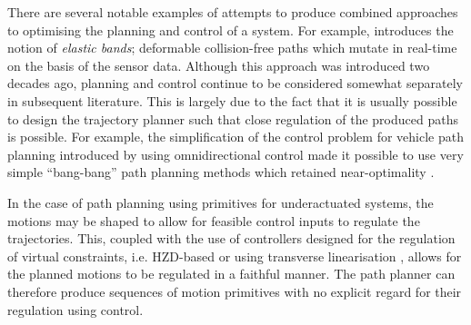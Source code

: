 There are several notable examples of attempts to produce combined approaches to optimising the planning and control of a system. For example, \cite{quinlan1993elastic} introduces the notion of \textit{elastic bands}; deformable collision-free paths which mutate in real-time on the basis of the sensor data. Although this approach was introduced two decades ago, planning and control continue to be considered somewhat separately in subsequent literature. This is largely due to the fact that it is usually possible to design the trajectory planner such that close regulation of the produced paths is possible. For example, the simplification of the control problem for vehicle path planning introduced by using omnidirectional control made it possible to use very simple ``bang-bang'' path planning methods which retained near-optimality \cite{kalmar2004near}.

In the case of path planning using primitives for underactuated systems, the motions may be shaped to allow for feasible control inputs to regulate the trajectories. This, coupled with the use of controllers designed for the regulation of virtual constraints, i.e. HZD-based \cite{sreenath2011compliant} or using transverse linearisation \cite{manchester2011stable}, allows for the planned motions to be regulated in a faithful manner. The path planner can therefore produce sequences of motion primitives with no explicit regard for their regulation using control.